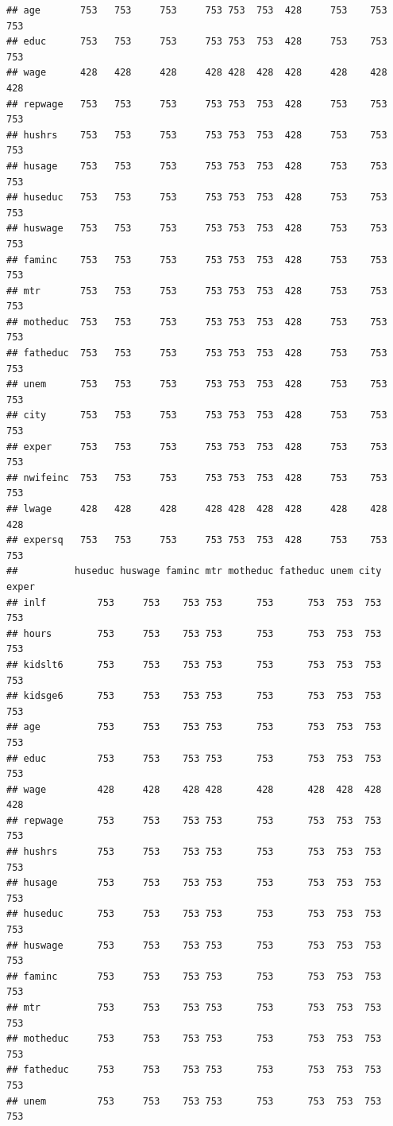 \documentclass[]{book}
\begin{document}
\begin{verbatim}
## age       753   753     753     753 753  753  428     753    753    753
## educ      753   753     753     753 753  753  428     753    753    753
## wage      428   428     428     428 428  428  428     428    428    428
## repwage   753   753     753     753 753  753  428     753    753    753
## hushrs    753   753     753     753 753  753  428     753    753    753
## husage    753   753     753     753 753  753  428     753    753    753
## huseduc   753   753     753     753 753  753  428     753    753    753
## huswage   753   753     753     753 753  753  428     753    753    753
## faminc    753   753     753     753 753  753  428     753    753    753
## mtr       753   753     753     753 753  753  428     753    753    753
## motheduc  753   753     753     753 753  753  428     753    753    753
## fatheduc  753   753     753     753 753  753  428     753    753    753
## unem      753   753     753     753 753  753  428     753    753    753
## city      753   753     753     753 753  753  428     753    753    753
## exper     753   753     753     753 753  753  428     753    753    753
## nwifeinc  753   753     753     753 753  753  428     753    753    753
## lwage     428   428     428     428 428  428  428     428    428    428
## expersq   753   753     753     753 753  753  428     753    753    753
##          huseduc huswage faminc mtr motheduc fatheduc unem city exper
## inlf         753     753    753 753      753      753  753  753   753
## hours        753     753    753 753      753      753  753  753   753
## kidslt6      753     753    753 753      753      753  753  753   753
## kidsge6      753     753    753 753      753      753  753  753   753
## age          753     753    753 753      753      753  753  753   753
## educ         753     753    753 753      753      753  753  753   753
## wage         428     428    428 428      428      428  428  428   428
## repwage      753     753    753 753      753      753  753  753   753
## hushrs       753     753    753 753      753      753  753  753   753
## husage       753     753    753 753      753      753  753  753   753
## huseduc      753     753    753 753      753      753  753  753   753
## huswage      753     753    753 753      753      753  753  753   753
## faminc       753     753    753 753      753      753  753  753   753
## mtr          753     753    753 753      753      753  753  753   753
## motheduc     753     753    753 753      753      753  753  753   753
## fatheduc     753     753    753 753      753      753  753  753   753
## unem         753     753    753 753      753      753  753  753   753

\end{verbatim}
\end{document}
